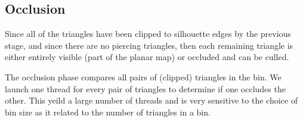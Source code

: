 \documentclass[review]{acmsiggraph}
\begin{document}
\subsection{Occlusion} \label{sec:occlusion}

Since all of the triangles have been clipped to silhouette edges by the
previous stage, and since there are no piercing triangles, then each remaining
triangle is either entirely visible (part of the planar map) or occluded and
can be culled.

The occlusion phase compares all pairs of (clipped) triangles in the bin. We
launch one thread for every pair of triangles to determine if one occludes the
other. This yeild a large number of threads and is very sensitive to the
choice of bin size as it related to the number of triangles in a bin.



\end{document}
